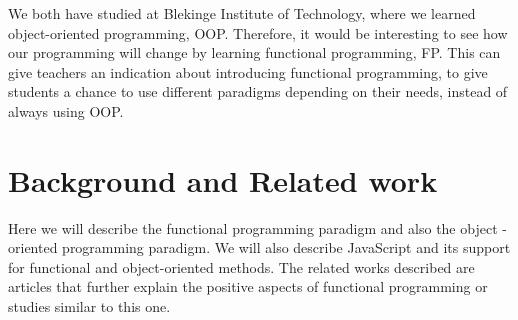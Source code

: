 \documentclass {article}
\begin{document}
We both have studied at Blekinge Institute of Technology, where we learned object-oriented programming, OOP. Therefore, it would be interesting to see how our programming will change by learning functional programming, FP. This can give teachers an indication about introducing functional programming, to give students a chance to use different paradigms depending on their needs, instead of always using OOP.
\section{Background and Related work}
Here we will describe the functional programming paradigm and also the object -oriented programming paradigm. We will also describe JavaScript and its support for functional and object-oriented methods. The related works described are articles that further explain the positive aspects of functional programming or studies similar to this one.
\end{document}
